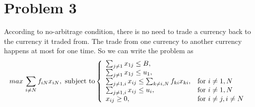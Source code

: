 \documentclass{article}
\begin{document}
\section{Problem 3}
According to no-arbitrage condition, there is no need to trade a currency back to the currency it traded from. The trade from one currency to another currency happens at most for one time. So we can write the problem as 
\begin{equation}  
max \,\sum_{i \not= N} f_{iN} x_{iN}, \text{ subject to}
\left\{  
             \begin{array}{ll}
             \sum_{j\not= 1}x_{1j}\leq B,\\
             \sum_{j\not= 1}x_{1j}\leq u_1,\\
             \sum_{j\not= 1, i}x_{ij}\leq \sum_{k\not=i,N}f_{ki} x_{ki},& \textnormal{for~} i\not= 1,N\\
             \sum_{j\not= 1, i}x_{ij}\leq u_i,& \textnormal{for~} i\not= 1,N\\
             x_{ij}\geq 0, & \textnormal{for~} i\not= j,i\not=N
             \end{array}  
\right.  
\end{equation}  
\end{document}
